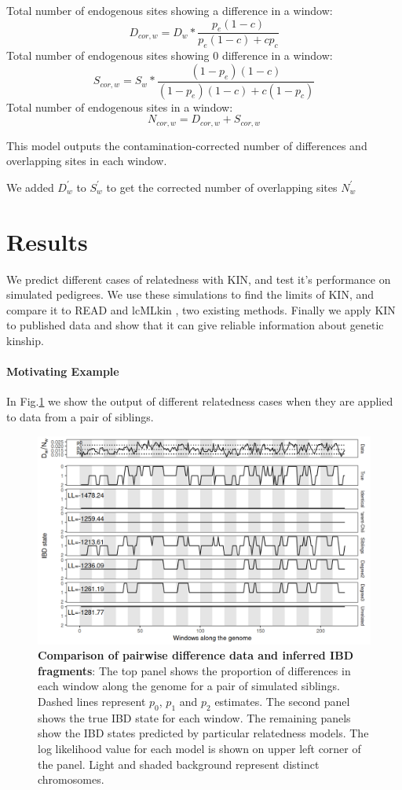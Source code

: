 \documentclass[12pt, letterpaper]{article}
\begin{document}
Total number of endogenous sites showing a difference in a window: 
$$D_{cor,w} = D_w* \frac{p_e(1-c)}{p_e(1-c) + c p_c} $$
Total number of endogenous sites showing 0 difference in a window: 
$$S_{cor,w} = S_w* \frac{(1-p_e)(1-c)}{(1-p_e)(1-c) + c (1-p_c)} $$
Total number of endogenous sites in a window:
$$N_{cor,w} = D_{cor,w} + S_{cor,w}$$

This model outputs the contamination-corrected number of differences and overlapping sites in each window.


We added $D_w^{'}$ to $S_w^{'}$ to get the corrected number of overlapping sites $N_w^{'}$  


\section{Results}\label{results}



We predict different cases of relatedness with KIN, and test it's performance on simulated pedigrees. We use these simulations to find the limits of KIN, and compare it to READ and lcMLkin \cite{lipatov_maximum_2015}, two existing methods. Finally we apply KIN to published data and show that it can give reliable information about genetic kinship.

\paragraph{Motivating Example}
In Fig.\ref{fig1:ibd} we show the output of different relatedness cases when they are applied to data from a pair of siblings.

\begin{figure}[h!]
    \includegraphics[width=16cm]{plots/plotimg/IBDplot.png}
    \centering
    \caption{\textbf{Comparison of pairwise difference data  and inferred IBD fragments}:  The top panel shows the proportion of differences in each window along the genome for a pair of simulated siblings. Dashed lines represent $p_0$, $p_1$ and $p_2$ estimates. The second panel shows the true IBD state for each window. The remaining panels show the IBD states predicted by particular relatedness models. The log likelihood value for each model is shown on upper left corner of the panel. Light and shaded background represent distinct chromosomes.}
    \label{fig1:ibd}
\end{figure}
\end{document}
